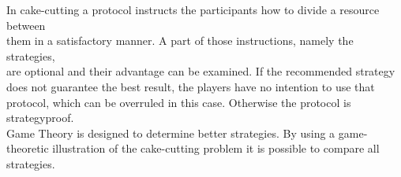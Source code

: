 In cake-cutting a protocol instructs the participants how to divide a resource between\\them in a satisfactory manner. A part of those instructions, namely the strategies,\\are optional and their advantage can be examined. If the recommended strategy does not guarantee the best result, the players have no intention to use that protocol, which can be overruled in this case. Otherwise the protocol is strategyproof.\\Game Theory is designed to determine better strategies. By using a game-theoretic illustration of the cake-cutting problem it is possible to compare all strategies.



